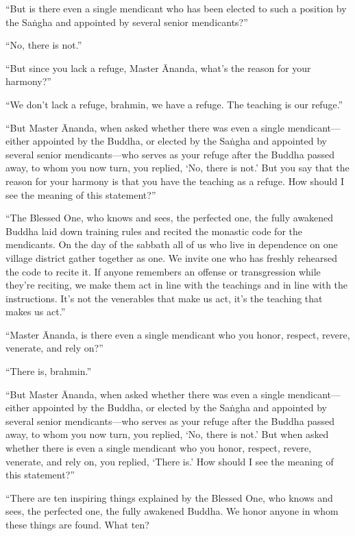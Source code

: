 \documentclass[12pt,openany]{book}%
\begin{document}
“But is there even a single mendicant who has been elected to such a position by the \textsanskrit{Saṅgha} and appointed by several senior mendicants?” 

“No, there is not.” 

“But since you lack a refuge, Master Ānanda, what’s the reason for your harmony?” 

“We don’t lack a refuge, brahmin, we have a refuge. The teaching is our refuge.” 

“But Master Ānanda, when asked whether there was even a single mendicant—either appointed by the Buddha, or elected by the \textsanskrit{Saṅgha} and appointed by several senior mendicants—who serves as your refuge after the Buddha passed away, to whom you now turn, you replied, ‘No, there is not.’ But you say that the reason for your harmony is that you have the teaching as a refuge. How should I see the meaning of this statement?” 

“The Blessed One, who knows and sees, the perfected one, the fully awakened Buddha laid down training rules and recited the monastic code for the mendicants. On the day of the sabbath all of us who live in dependence on one village district gather together as one. We invite one who has freshly rehearsed the code to recite it. If anyone remembers an offense or transgression while they’re reciting, we make them act in line with the teachings and in line with the instructions. It’s not the venerables that make us act, it’s the teaching that makes us act.” 

“Master Ānanda, is there even a single mendicant who you honor, respect, revere, venerate, and rely on?” 

“There is, brahmin.” 

“But Master Ānanda, when asked whether there was even a single mendicant—either appointed by the Buddha, or elected by the \textsanskrit{Saṅgha} and appointed by several senior mendicants—who serves as your refuge after the Buddha passed away, to whom you now turn, you replied, ‘No, there is not.’ But when asked whether there is even a single mendicant who you honor, respect, revere, venerate, and rely on, you replied, ‘There is.’ How should I see the meaning of this statement?” 

“There are ten inspiring things explained by the Blessed One, who knows and sees, the perfected one, the fully awakened Buddha. We honor anyone in whom these things are found. What ten? 
\end{document}
